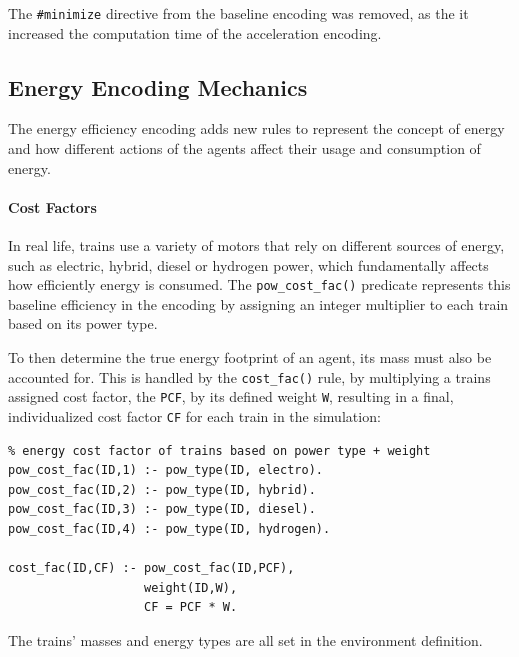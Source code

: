 The \texttt{\#minimize} directive from the baseline encoding was removed, as the it increased the computation time of the acceleration encoding.

\subsection{Energy Encoding Mechanics}
The energy efficiency encoding adds new rules to represent the concept of energy and how different actions of the agents affect their usage and consumption of energy.

\paragraph{Cost Factors}
In real life, trains use a variety of motors that rely on different sources of energy, such as electric, hybrid, diesel or hydrogen power, which fundamentally affects how efficiently energy is consumed. The \texttt{pow\_cost\_fac()} predicate represents this baseline efficiency in the encoding by assigning an integer multiplier to each train based on its power type.

To then determine the true energy footprint of an agent, its mass must also be accounted for. This is handled by the \texttt{cost\_fac()} rule, by multiplying a trains assigned cost factor, the \texttt{PCF}, by its defined weight \texttt{W}, resulting in a final, individualized cost factor \texttt{CF} for each train in the simulation:
\begin{verbatim}
% energy cost factor of trains based on power type + weight
pow_cost_fac(ID,1) :- pow_type(ID, electro).
pow_cost_fac(ID,2) :- pow_type(ID, hybrid).
pow_cost_fac(ID,3) :- pow_type(ID, diesel).
pow_cost_fac(ID,4) :- pow_type(ID, hydrogen).

cost_fac(ID,CF) :- pow_cost_fac(ID,PCF),
                   weight(ID,W),
                   CF = PCF * W.
\end{verbatim}

The trains' masses and energy types are all set in the environment definition.

